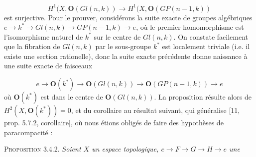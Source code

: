 \[
H^1(X,\mathbf O(\mathit{Gl}(n,k))
\to
H^1(X,\mathbf O(\mathit{GP}(n-1,k))
\]
est surjective. Pour le prouver, considérons la suite exacte de groupes
algébriques
$e\to k^*\to\mathit{Gl}(n,k)\to\mathit{GP}(n-1,k)\to e$,
où le premier homomorphisme est l'isomorphisme naturel de $k^*$ sur le centre
de $\mathit{Gl}(n,k)$. On constate facilement que la fibration de
$\mathit{Gl}(n,k)$ par le sous-groupe $k^*$ est localement triviale
(i.e. il existe une section rationelle), donc la suite exacte précédente
donne naissance à une suite exacte de faisceaux

\[
e\to\mathbf O(k^*)
\to\mathbf O(\mathit{Gl}(n,k))
\to\mathbf O(\mathit{GP}(n-1,k))
\to e
\]
où $\mathbf O(k^*)$ est dans le centre de
$\mathbf O(\mathit{Gl}(n,k))$. La proposition résulte alors de
$H^2(X,\mathbf O(k^*))=0$, et du corollaire au résultat suivant, qui
généralise [11, prop. 5.7.2, corollaire], où nous étions obligés de faire des
hypothèses de paracompacité :

\indent\textsc{Proposition 3.4.2.} \textit{Soient $X$ un espace topologique,
$e\to F\to G\to H\to e$ une}

